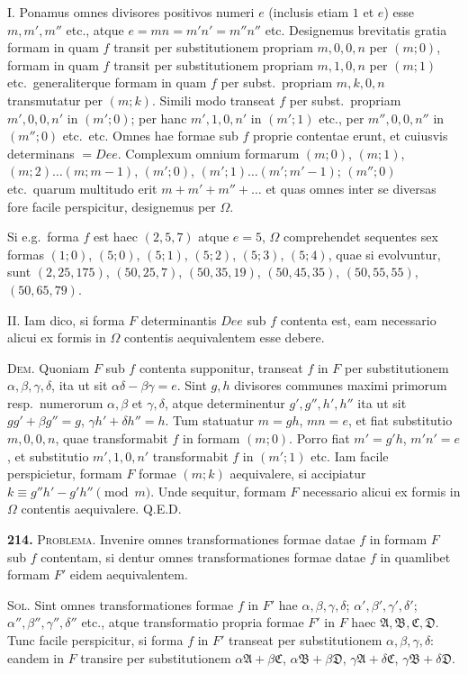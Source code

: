 \documentclass[12pt,a4paper]{article}
\theoremstyle{plain}
\theoremstyle{definition}
\theoremstyle{remark}
\begin{document}
I. Ponamus omnes divisores positivos numeri $e$ (inclusis etiam $1$ et $e$) esse $m,m',m''$ etc., atque $e=mn=m'n'=m''n''$ etc. Designemus brevitatis gratia formam in quam $f$ transit per substitutionem propriam $m,0,0,n$ per $(m;0)$, formam in quam $f$ transit per substitutionem propriam $m,1,0,n$ per $(m;1)$ etc.\ generaliterque formam in quam $f$ per subst.\ propriam $m,k,0,n$ transmutatur per $(m;k)$. Simili modo transeat $f$ per subst.\ propriam $m',0,0,n'$ in $(m';0)$; per hanc $m',1,0,n'$ in $(m';1)$ etc., per $m'',0,0,n''$ in $(m'';0)$ etc.\ etc. Omnes hae formae sub $f$ proprie contentae erunt, et cuiusvis determinans $=Dee$. Complexum omnium formarum $(m;0)$, $(m;1)$, $(m;2)\ldots(m;m-1)$, $(m';0)$, $(m';1)\ldots(m';m'-1)$; $(m'';0)$ etc.\ quarum multitudo erit $m+m'+m''+\ldots$ et quas omnes inter se diversas fore facile perspicitur, designemus per $\Omega$.

Si e.g.\ forma $f$ est haec $(2,5,7)$ atque $e=5$, $\Omega$ comprehendet sequentes sex formas $(1;0)$, $(5;0)$, $(5;1)$, $(5;2)$, $(5;3)$, $(5;4)$, quae si evolvuntur, sunt $(2,25,175)$, $(50,25,7)$, $(50,35,19)$, $(50,45,35)$, $(50,55,55)$, $(50,65,79)$.

II. Iam dico, si forma $F$ determinantis $Dee$ sub $f$ contenta est, eam necessario alicui ex formis in $\Omega$ contentis aequivalentem esse debere.

\textsc{Dem.} Quoniam $F$ sub $f$ contenta supponitur, transeat $f$ in $F$ per substitutionem $\alpha,\beta,\gamma,\delta$, ita ut sit $\alpha\delta-\beta\gamma=e$. Sint $g,h$ divisores communes maximi primorum resp.\ numerorum $\alpha,\beta$ et $\gamma,\delta$, atque determinentur $g',g'',h',h''$ ita ut sit $gg'+\beta g''=g$, $\gamma h'+\delta h''=h$. Tum statuatur $m=gh$, $mn=e$, et fiat substitutio $m,0,0,n$, quae transformabit $f$ in formam $(m;0)$. Porro fiat $m'=g'h$, $m'n'=e$, et substitutio $m',1,0,n'$ transformabit $f$ in $(m';1)$ etc. Iam facile perspicietur, formam $F$ formae $(m;k)$ aequivalere, si accipiatur $k\equiv g''h'-g'h''\pmod{m}$. Unde sequitur, formam $F$ necessario alicui ex formis in $\Omega$ contentis aequivalere. Q.E.D.

\textbf{214.} \textsc{Problema.} Invenire omnes transformationes formae datae $f$ in formam $F$ sub $f$ contentam, si dentur omnes transformationes formae datae $f$ in quamlibet formam $F'$ eidem aequivalentem.

\textsc{Sol.} Sint omnes transformationes formae $f$ in $F'$ hae $\alpha,\beta,\gamma,\delta$; $\alpha',\beta',\gamma',\delta'$; $\alpha'',\beta'',\gamma'',\delta''$ etc., atque transformatio propria formae $F'$ in $F$ haec $\mathfrak{A},\mathfrak{B},\mathfrak{C},\mathfrak{D}$. Tunc facile perspicitur, si forma $f$ in $F'$ transeat per substitutionem $\alpha,\beta,\gamma,\delta$: eandem in $F$ transire per substitutionem $\alpha\mathfrak{A}+\beta\mathfrak{C}$, $\alpha\mathfrak{B}+\beta\mathfrak{D}$, $\gamma\mathfrak{A}+\delta\mathfrak{C}$, $\gamma\mathfrak{B}+\delta\mathfrak{D}$.
\end{document}
